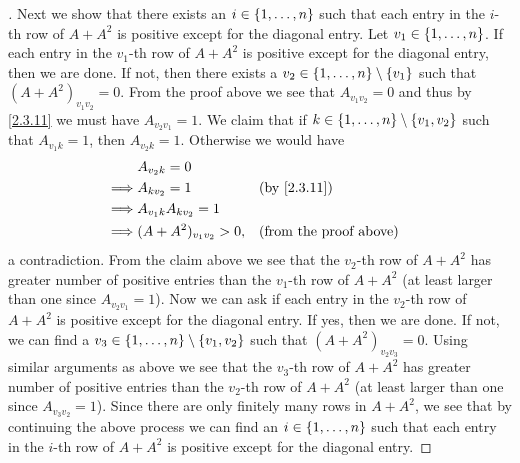 \begin{proof}[]
  Next we show that there exists an \(i \in \left\lbrace1, \dots, n\right\rbrace\) such that each entry in the \(i\)-th row of \(A + A^2\) is positive except for the diagonal entry.
  Let \(v_1 \in \left\lbrace1, \dots, n\right\rbrace\).
  If each entry in the \(v_1\)-th row of \(A + A^2\) is positive except for the diagonal entry, then we are done.
  If not, then there exists a \(v_2 \in \left\lbrace1, \dots, n\right\rbrace \setminus \left\lbrace v_1\right\rbrace\) such that \((A + A^2)_{v_1 v_2} = 0\).
  From the proof above we see that \(A_{v_1 v_2} = 0\) and thus by \cref{2.3.11} we must have \(A_{v_2 v_1} = 1\).
  We claim that if \(k \in \left\lbrace1, \dots, n\right\rbrace \setminus \left\lbrace v_1, v_2\right\rbrace\) such that \(A_{v_1 k} = 1\), then \(A_{v_2 k} = 1\).
  Otherwise we would have
  \begin{align*}
             & A_{v_2 k} = 0                                               \\
    \implies & A_{k v_2} = 1            &  & \text{(by \cref{2.3.11})}     \\
    \implies & A_{v_1 k} A_{k v_2} = 1                                     \\
    \implies & (A + A^2)_{v_1 v_2} > 0, &  & \text{(from the proof above)}
  \end{align*}
  a contradiction.
  From the claim above we see that the \(v_2\)-th row of \(A + A^2\) has greater number of positive entries than the \(v_1\)-th row of \(A + A^2\) (at least larger than one since \(A_{v_2 v_1} = 1\)).
  Now we can ask if each entry in the \(v_2\)-th row of \(A + A^2\) is positive except for the diagonal entry.
  If yes, then we are done.
  If not, we can find a \(v_3 \in \left\lbrace1, \dots, n\right\rbrace \setminus \left\lbrace v_1, v_2\right\rbrace\) such that \((A + A^2)_{v_2 v_3} = 0\).
  Using similar arguments as above we see that the \(v_3\)-th row of \(A + A^2\) has greater number of positive entries than the \(v_2\)-th row of \(A + A^2\) (at least larger than one since \(A_{v_3 v_2} = 1\)).
  Since there are only finitely many rows in \(A + A^2\), we see that by continuing the above process we can find an \(i \in \left\lbrace1, \dots, n\right\rbrace\) such that each entry in the \(i\)-th row of \(A + A^2\) is positive except for the diagonal entry.


\end{proof}
